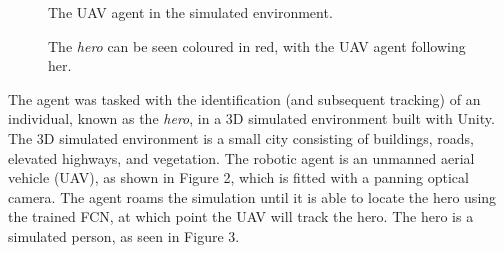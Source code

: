 \documentclass[a4paper]{article}
\begin{document}
\begin{figure}[h]
\begin{minipage}{0.45\textwidth}
\centering
{}
\caption{The UAV agent in the simulated environment.}
\end{minipage}
\hspace{1cm}
\begin{minipage}{0.45\textwidth}
\centering
{}
\caption{The \textit{hero} can be seen coloured in red, with the UAV agent following her.}
\end{minipage}
\end{figure}

The agent was tasked with the identification (and subsequent tracking) of an individual, known as the \textit{hero}, in a 3D simulated environment built with Unity. The 3D simulated environment is a small city consisting of buildings, roads, elevated highways, and vegetation. The robotic agent is an unmanned aerial vehicle (UAV), as shown in Figure 2, which is fitted with a panning optical camera. The agent roams the simulation until it is able to locate the hero using the trained FCN, at which point the UAV will track the hero. The hero is a simulated person, as seen in Figure 3.
\end{document}

